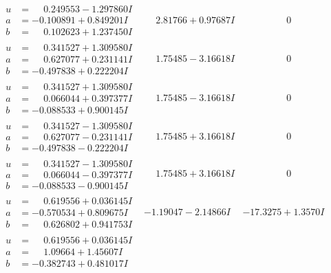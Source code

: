 \documentclass[1p]{elsarticle_modified}
\theoremstyle{definition}
\begin{document}
$$\begin{array}{c|c|c}
\begin{aligned}
u &= \phantom{-}0.249553 - 1.297860 I \\
a &= -0.100891 + 0.849201 I \\
b &= \phantom{-}0.102623 + 1.237450 I\end{aligned}
 & \phantom{-}2.81766 + 0.97687 I & \phantom{-0.000000 } 0 \\ \hline\begin{aligned}
u &= \phantom{-}0.341527 + 1.309580 I \\
a &= \phantom{-}0.627077 + 0.231141 I \\
b &= -0.497838 + 0.222204 I\end{aligned}
 & \phantom{-}1.75485 - 3.16618 I & \phantom{-0.000000 } 0 \\ \hline\begin{aligned}
u &= \phantom{-}0.341527 + 1.309580 I \\
a &= \phantom{-}0.066044 + 0.397377 I \\
b &= -0.088533 + 0.900145 I\end{aligned}
 & \phantom{-}1.75485 - 3.16618 I & \phantom{-0.000000 } 0 \\ \hline\begin{aligned}
u &= \phantom{-}0.341527 - 1.309580 I \\
a &= \phantom{-}0.627077 - 0.231141 I \\
b &= -0.497838 - 0.222204 I\end{aligned}
 & \phantom{-}1.75485 + 3.16618 I & \phantom{-0.000000 } 0 \\ \hline\begin{aligned}
u &= \phantom{-}0.341527 - 1.309580 I \\
a &= \phantom{-}0.066044 - 0.397377 I \\
b &= -0.088533 - 0.900145 I\end{aligned}
 & \phantom{-}1.75485 + 3.16618 I & \phantom{-0.000000 } 0 \\ \hline\begin{aligned}
u &= \phantom{-}0.619556 + 0.036145 I \\
a &= -0.570534 + 0.809675 I \\
b &= \phantom{-}0.626802 + 0.941753 I\end{aligned}
 & -1.19047 - 2.14866 I & -17.3275 + 1.3570 I \\ \hline\begin{aligned}
u &= \phantom{-}0.619556 + 0.036145 I \\
a &= \phantom{-}1.09664 + 1.45607 I \\
b &= -0.382743 + 0.481017 I\end{aligned}

\end{array}$$
\end{document}
